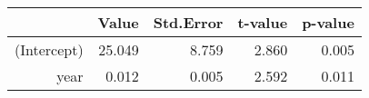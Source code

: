\begin{table}[ht]
\centering
\begin{tabular}{rrrrr}
  \hline
 & Value & Std.Error & t-value & p-value \\ 
  \hline
(Intercept) & 25.049 & 8.759 & 2.860 & 0.005 \\ 
  year & 0.012 & 0.005 & 2.592 & 0.011 \\ 
   \hline
\end{tabular}
\end{table}
